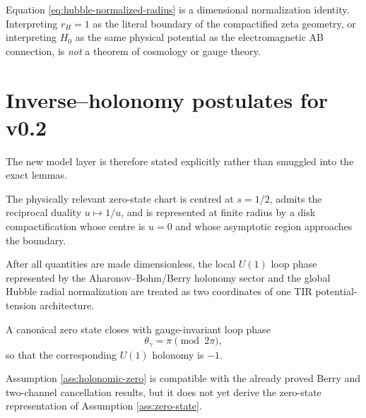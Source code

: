 \begin{warning}
Equation \eqref{eq:hubble-normalized-radius} is a dimensional normalization identity.  Interpreting $r_H=1$ as the literal boundary of the compactified zeta geometry, or interpreting $H_0$ as the same physical potential as the electromagnetic AB connection, is \emph{not} a theorem of cosmology or gauge theory.
\end{warning}

\section{Inverse--holonomy postulates for v0.2}
The new model layer is therefore stated explicitly rather than smuggled into the exact lemmas.

\begin{assumption}
\label{ass:inverse-holonomy}
The physically relevant zero-state chart is centred at $s=1/2$, admits the reciprocal duality $u\mapsto1/u$, and is represented at finite radius by a disk compactification whose centre is $u=0$ and whose asymptotic region approaches the boundary.
\end{assumption}

\begin{assumption}
\label{ass:potential-tension}
After all quantities are made dimensionless, the local $U(1)$ loop phase represented by the Aharonov--Bohm/Berry holonomy sector and the global Hubble radial normalization are treated as two coordinates of one TIR potential-tension architecture.
\end{assumption}

\begin{assumption}
\label{ass:holonomic-zero}
A canonical zero state closes with gauge-invariant loop phase
\begin{equation}
\theta_\gamma=\pi\pmod{2\pi},
\end{equation}
so that the corresponding $U(1)$ holonomy is $-1$.
\end{assumption}

Assumption \ref{ass:holonomic-zero} is compatible with the already proved Berry and two-channel cancellation results, but it does not yet derive the zero-state representation of Assumption \ref{ass:zero-state}.

